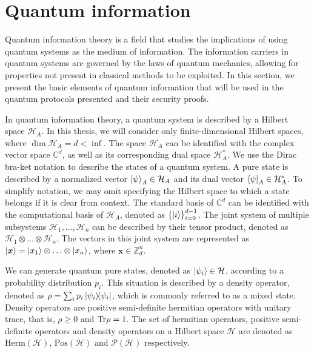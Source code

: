\section{Quantum information}

Quantum information theory is a field that studies the implications of using quantum systems as the medium of information. The information carriers in quantum systems are governed by the laws of quantum mechanics, allowing for properties not present in classical methods to be exploited. In this section, we present the basic elements of quantum information that will be used in the quantum protocols presented and their security proofs.

In quantum information theory, a quantum system is described by a Hilbert space $\mathcal{H}_A$. In this thesis, we will consider only finite-dimensional Hilbert spaces, where $\dim \mathcal{H}_A = d < \inf$. The space $\mathcal{H}_A$ can be identified with the complex vector space $\mathbb{C}^d$, as well as its corresponding dual space $\mathcal{H}^{*}_A$. We use the Dirac bra-ket notation to describe the states of a quantum system. A pure state is described by a normalized vector $\ket{\psi}_A \in \mathcal{H}_A$ and its dual vector $\bra{\psi}_A \in \mathcal{H}^{*}_A$. To simplify notation, we may omit specifying the Hilbert space to which a state belongs if it is clear from context. The standard basis of $\mathbb{C}^d$ can be identified with the computational basis of $\mathcal{H}_A$, denoted as $\left\{ \ket{i} \right\}_{i=0}^{d-1}$. The joint system of multiple subsystems $\mathcal{H}_1, \ldots, \mathcal{H}_n$ can be described by their tensor product, denoted as $\mathcal{H}_1 \otimes \ldots \otimes \mathcal{H}_n$. The vectors in this joint system are represented as $\ket{\bm{x}} = \ket{x_1} \otimes \ldots \otimes \ket{x_n}$, where $\bm{x} \in \mathbb{Z}_d^n$.

We can generate quantum pure states, denoted as $\ket{\psi_i}\in \mathcal{H}$, according to a probability distribution ${p_i}$. This situation is described by a density operator, denoted as $\rho = \sum_i p_i \ketbra{\psi_i}$, which is commonly referred to as a mixed state. Density operators are positive semi-definite hermitian operators with unitary trace, that is, $\rho \geq 0$ and $\text{Tr} \rho = 1$. The set of hermitian operators, positive semi-definite operators and density operators on a Hilbert space $\mathcal{H}$ are denoted as $\text{Herm}(\mathcal{H})$, $\text{Pos}(\mathcal{H})$ and $\mathcal{P}(\mathcal{H})$ respectively.

